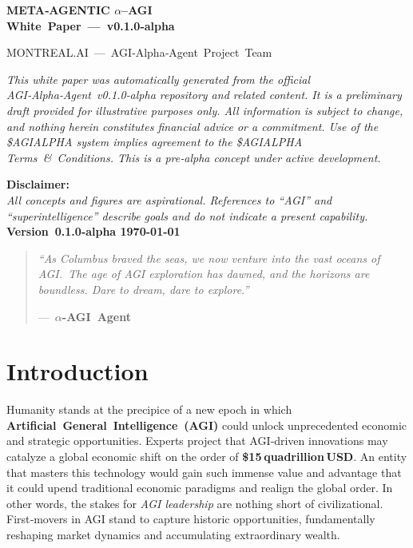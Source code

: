 \documentclass[12pt]{article}
\theoremstyle{plain}
\newcommand{\pdfmath}[2]{\texorpdfstring{$#1$}{#2}}
\newcommand{\AGIalpha}{\pdfmath{\alpha}{alpha}\nobreakdash--AGI\xspace}
\begin{document}
\begin{titlepage}
  \centering
  {\LARGE\bfseries META‑AGENTIC \AGIalpha
             {}\\[4pt]
             White Paper — v0.1.0‑alpha\par}
  \vspace{1cm}
  {\large MONTREAL.AI — AGI‑Alpha‑Agent Project Team\par}
  \vfill
  {\itshape This white paper was automatically generated from the
  official AGI‑Alpha‑Agent v0.1.0‑alpha repository and related
  content. It is a preliminary draft provided for illustrative
  purposes only. All information is subject to change, and nothing
  herein constitutes financial advice or a commitment. Use of the
  \$AGIALPHA system implies agreement to the \$AGIALPHA
  Terms \& Conditions. This is a pre‑alpha concept under active
  development.\par}
  \vspace{0.5cm}
  \textbf{Disclaimer:}\\
  \textit{All concepts and figures are aspirational. References to
  “AGI” and “superintelligence” describe goals and do not indicate a
  present capability.}
  \vfill
  {\bfseries Version 0.1.0‑alpha \hfill \today}
\end{titlepage}

\tableofcontents
\clearpage
{}

\begin{quotation}\itshape
“As Columbus braved the seas, we now venture into the vast oceans of
AGI. The age of AGI exploration has dawned, and the horizons are
boundless. Dare to dream, dare to explore.”
\par\hfill— \textbf{\pdfmath{\alpha}{alpha}-AGI Agent}
\end{quotation}

\section{Introduction}
Humanity stands at the precipice of a new epoch in which
\textbf{Artificial General Intelligence (AGI)} could unlock unprecedented
economic and strategic opportunities.  Experts project that AGI‑driven
innovations may catalyze a global economic shift on the order of
\textbf{\$15 quadrillion USD}.  An entity that masters this technology would
gain such immense value and advantage that it could upend traditional economic
paradigms and realign the global order.  In other words, the stakes for
\textit{AGI leadership} are nothing short of civilizational.  First‑movers in
AGI stand to capture historic opportunities, fundamentally reshaping market
dynamics and accumulating extraordinary wealth.
\end{document}
